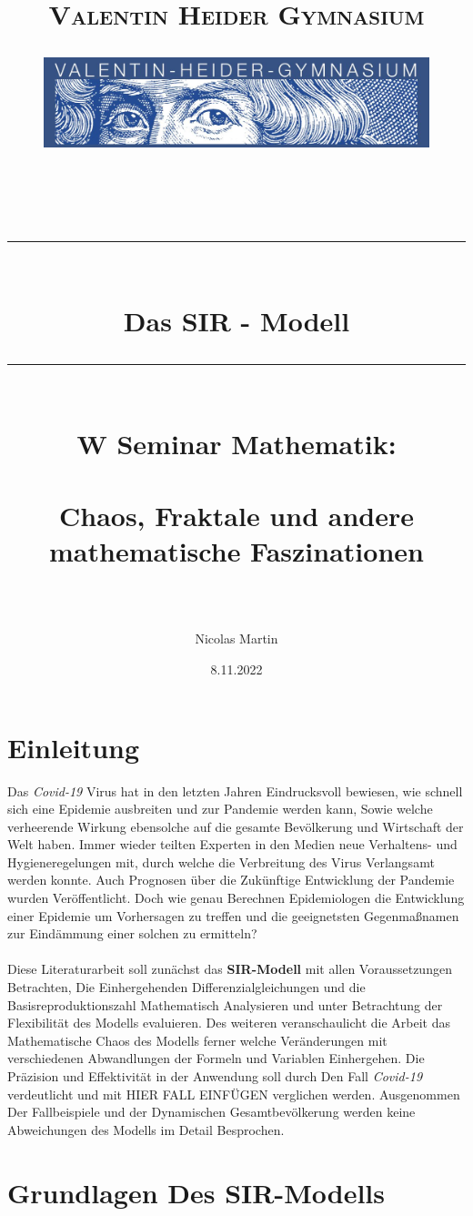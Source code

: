 \documentclass[12pt]{scrartcl} %
\title{	
	\normalfont\normalsize
	\vspace{200pt}
	\textsc{Valentin Heider Gymnasium}\\
	\begin{figure}[h] %
	\centering
	\includegraphics[width=0.5\columnwidth]{VHGLogo.jpg} 
	\end{figure}
	\vspace{25pt}\\
	
	\rule{\linewidth}{0.5pt}\\
	\vspace{20pt}
	{\huge Das SIR - Modell}\\
	\vspace{12pt}
	\rule{\linewidth}{2pt}\\
	\vspace{20pt}
	{\Large W Seminar Mathematik:}\\
	\vspace{12pt}\\
	{\Large Chaos, Fraktale und andere mathematische Faszinationen}\\
	\vspace{15pt}\\
}
\author{\LARGE Nicolas Martin}
\date{\normalsize 8.11.2022}
\begin{document}
\maketitle %
\thispagestyle{empty}
\newpage

\doublespacing
\tableofcontents
\thispagestyle{empty}
\cleardoublepage
\onehalfspacing
\newpage

\section{Einleitung}


Das \textsl{Covid-19} Virus hat in den letzten Jahren Eindrucksvoll bewiesen, wie schnell sich eine Epidemie ausbreiten und zur Pandemie werden kann,  
Sowie welche verheerende Wirkung ebensolche auf die gesamte Bevölkerung und Wirtschaft der Welt haben. 
Immer wieder teilten Experten in den Medien neue Verhaltens- und Hygieneregelungen mit, durch welche die Verbreitung des Virus Verlangsamt werden konnte. Auch Prognosen über die Zukünftige Entwicklung der Pandemie wurden Veröffentlicht. 
Doch wie genau Berechnen Epidemiologen die Entwicklung einer Epidemie um Vorhersagen zu treffen und die geeignetsten Gegenmaßnamen zur Eindämmung einer solchen zu ermitteln?\\
\\
Diese Literaturarbeit soll zunächst das \textbf{SIR-Modell} mit allen Voraussetzungen Betrachten, Die Einhergehenden Differenzialgleichungen und die Basisreproduktionszahl Mathematisch Analysieren und unter Betrachtung der Flexibilität des Modells evaluieren. 
Des weiteren veranschaulicht die Arbeit das Mathematische Chaos des Modells 
ferner welche Veränderungen mit verschiedenen Abwandlungen der Formeln und Variablen Einhergehen. 
Die Präzision und Effektivität in der Anwendung soll durch Den Fall \textsl{Covid-19} verdeutlicht und mit  HIER FALL EINFÜGEN verglichen werden. 
Ausgenommen Der Fallbeispiele und der Dynamischen Gesamtbevölkerung werden keine Abweichungen des Modells im Detail Besprochen. 


\newpage
\section{Grundlagen Des SIR-Modells}
\end{document}
